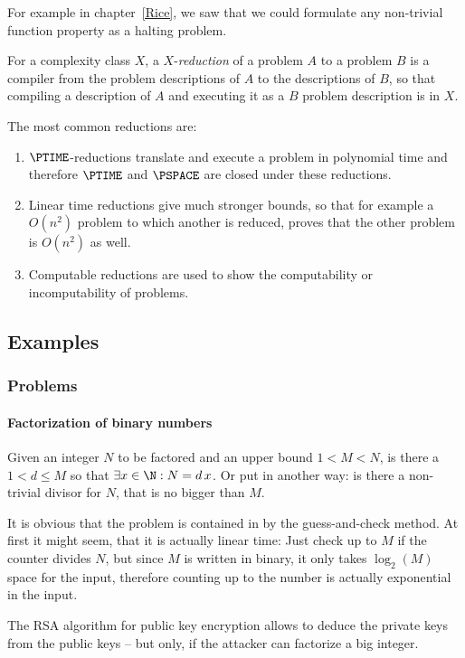 For example in chapter~\ref{Rice}, we saw that we could formulate any 
non-trivial function property as a halting problem. \TODO{}

\begin{defn}
	For a complexity class $X$, a $X$-\emph{reduction} of a problem $A$ to a
	problem $B$ is a compiler from the problem descriptions of $A$ to the 
	descriptions of $B$, so that compiling a description of $A$ and executing 
	it as a $B$ problem description is in $X$.
\end{defn}

\begin{example}
	The most common reductions are:
	\begin{enumerate}
		\item $\PTIME$-reductions translate and execute a problem in polynomial 
			time and therefore $\PTIME$ and $\PSPACE$ are closed under these reductions.
		\item Linear time reductions give much stronger bounds, so that for example
			a $O(n^2)$ problem to which another is reduced, proves that the other 
			problem is $O(n^2)$ as well.
		\item Computable reductions are used to show the computability or 
			incomputability of problems.
	\end{enumerate}
\end{example}

\subsection{Examples}
\subsubsection{Problems}
\paragraph{Factorization of binary numbers}
Given an integer $N$ to be factored and an upper bound $1<M<N$, is there a 
$1<d\leq M$ so that $\exists x\in \N: N = d\,x$. Or put in another way: is 
there a non-trivial divisor for $N$, that is no bigger than $M$.

It is obvious that the problem is contained in \NPTIME by the guess-and-check 
method. At first it might seem, that it is actually linear time: Just check 
up to $M$ if the counter divides $N$, but since $M$ is written in binary, it 
only takes $\log_2(M)$ space for the input, therefore counting up to the 
number is actually exponential in the input.
\begin{example}[Relevance] 
	The RSA algorithm for
	public key encryption allows to deduce the private
	keys from the public keys -- but only, if the
	attacker can factorize a big integer.
\end{example}

